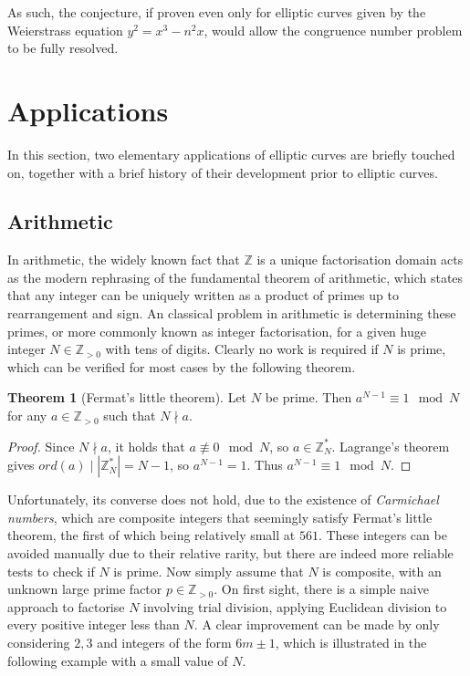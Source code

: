 \documentclass{article}
\newcommand{\Z}{\mathbb{Z}}
\newcommand{\rb}[1]{\left( #1 \right)}
\newcommand{\abs}[1]{\left\lvert #1 \right\rvert}
\theoremstyle{definition}\newtheorem*{definition}{Definition}
\theoremstyle{definition}\newtheorem*{example}{Example}
\theoremstyle{definition}\newtheorem*{remark}{Remark}
\newtheorem{theorem}[proposition]{Theorem}
\begin{document}
As such, the conjecture, if proven even only for elliptic curves given by the Weierstrass equation $ y^2 = x^3 - n^2x $, would allow the congruence number problem to be fully resolved.

\pagebreak

\section{Applications}

In this section, two elementary applications of elliptic curves are briefly touched on, together with a brief history of their development prior to elliptic curves.

\subsection{Arithmetic}

In arithmetic, the widely known fact that $ \Z $ is a unique factorisation domain acts as the modern rephrasing of the fundamental theorem of arithmetic, which states that any integer can be uniquely written as a product of primes up to rearrangement and sign. An classical problem in arithmetic is determining these primes, or more commonly known as integer factorisation, for a given huge integer $ N \in \Z_{> 0} $ with tens of digits. Clearly no work is required if $ N $ is prime, which can be verified for most cases by the following theorem.

\begin{theorem}[Fermat's little theorem]
Let $ N $ be prime. Then $ a^{N - 1} \equiv 1 \mod N $ for any $ a \in \Z_{> 0} $ such that $ N \nmid a $.
\end{theorem}

\begin{proof}
Since $ N \nmid a $, it holds that $ a \not\equiv 0 \mod N $, so $ a \in \Z_N^* $. Lagrange's theorem gives $ ord\rb{a} \mid \abs{\Z_N^*} = N - 1 $, so $ a^{N - 1} = 1 $. Thus $ a^{N - 1} \equiv 1 \mod N $.
\end{proof}

Unfortunately, its converse does not hold, due to the existence of \emph{Carmichael numbers}, which are composite integers that seemingly satisfy Fermat's little theorem, the first of which being relatively small at $ 561 $. These integers can be avoided manually due to their relative rarity, but there are indeed more reliable tests to check if $ N $ is prime. Now simply assume that $ N $ is composite, with an unknown large prime factor $ p \in \Z_{> 0} $. On first sight, there is a simple naive approach to factorise $ N $ involving trial division, applying Euclidean division to every positive integer less than $ N $. A clear improvement can be made by only considering $ 2, 3 $ and integers of the form $ 6m \pm 1 $, which is illustrated in the following example with a small value of $ N $.
\end{document}
